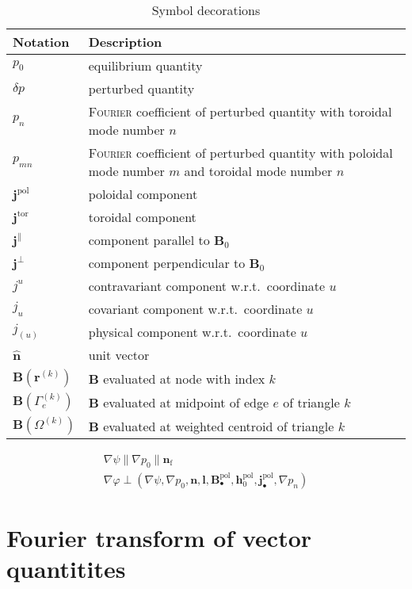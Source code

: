 \documentclass[a4paper, 10pt, english]{article}
\let\temp\varrho
\let\varrho\rho
\let\rho\temp
\let\temp\vartheta
\let\vartheta\theta
\let\theta\temp
\let\temp\varphi
\let\varphi\phi
\let\phi\temp
\let\vec\symbf
\newcommand*\pol{\ensuremath{\textrm{pol}}}  %
\newcommand*\tor{\ensuremath{\textrm{tor}}}  %
\newcommand*\fs{\ensuremath{\textrm{f}}}  %
\begin{document}
\begin{longtable}{l >{\RaggedRight}p{}}
  \caption{Symbol decorations} \\
  \toprule
  \textbf{Notation} & \textbf{Description} \\
  \midrule
  \endhead
  $p_{0}$ & equilibrium quantity \\
  $\delta p$ & perturbed quantity \\
  $p_{n}$ & \textsc{Fourier} coefficient of perturbed quantity with toroidal mode number $n$ \\
  $p_{m n}$ & \textsc{Fourier} coefficient of perturbed quantity with poloidal mode number $m$ and toroidal mode number $n$ \\
  \midrule
  $\vec{j}^{\pol}$ & poloidal component \\
  $\vec{j}^{\tor}$ & toroidal component \\
  $\vec{j}^{\parallel}$ & component parallel to $\vec{B}_{0}$ \\
  $\vec{j}^{\perp}$ & component perpendicular to $\vec{B}_{0}$ \\
  $j^{u}$ & contravariant component w.r.t.\ coordinate $u$ \\
  $j_{u}$ & covariant component w.r.t.\ coordinate $u$ \\
  $j_{(u)}$ & physical component w.r.t.\ coordinate $u$ \\
  $\hat{\vec{n}}$ & unit vector \\
  \midrule
  $\vec{B} (\vec{r}^{(k)})$ & $\vec{B}$ evaluated at node with index $k$ \\
  $\vec{B} (\Gamma_{e}^{(k)})$ & $\vec{B}$ evaluated at midpoint of edge $e$ of triangle $k$ \\
  $\vec{B} (\Omega^{(k)})$ & $\vec{B}$ evaluated at weighted centroid of triangle $k$ \\
  \bottomrule
\end{longtable}

\begin{gather*}
  \nabla \psi \parallel \nabla p_{0} \parallel \vec{n}_{\fs} \\
  \nabla \phi \perp \left( \nabla \psi, \nabla p_{0}, \vec{n}, \vec{l}, \vec{B}_{\bullet}^{\pol}, \vec{h}_{0}^{\pol}, \vec{j}_{\bullet}^{\pol}, \nabla p_{n} \right)
\end{gather*}


\section{Fourier transform of vector quantitites}
\end{document}
